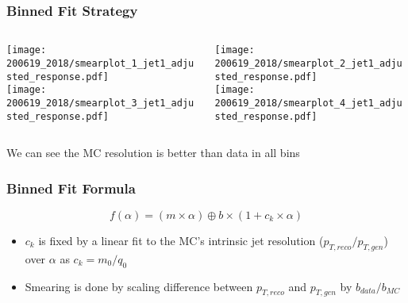\documentclass{beamer}
\begin{document}
\begin{frame}
  \frametitle{Binned Fit Strategy}

  \begin{columns}
    \begin{column}{0.3\linewidth}
      \centering
      \texttt{[image: 200619\_2018/smearplot\_1\_jet1\_adjusted\_response.pdf]} \\
      \texttt{[image: 200619\_2018/smearplot\_3\_jet1\_adjusted\_response.pdf]}
    \end{column}
    \begin{column}{0.3\linewidth}
      \centering
      \texttt{[image: 200619\_2018/smearplot\_2\_jet1\_adjusted\_response.pdf]} \\
      \texttt{[image: 200619\_2018/smearplot\_4\_jet1\_adjusted\_response.pdf]}
    \end{column}
  \end{columns}

  \vfill
  We can see the MC resolution is better than data in all bins

\end{frame}


\begin{frame}
  \frametitle{Binned Fit Formula}

  \[
  f(\alpha) = (m \times \alpha) \oplus b \times (1 + c_k \times \alpha)
  \]

  \begin{itemize}
  \item $c_k$ is fixed by a linear fit to the MC's intrinsic jet resolution ($p_{T, reco}/p_{T, gen}$) over $\alpha$ as $c_k = m_0/q_0$
  \item Smearing is done by scaling difference between $p_{T,reco}$ and $p_{T,gen}$ by $b_{data}/b_{MC}$
  \end{itemize}

\end{frame}
\end{document}
